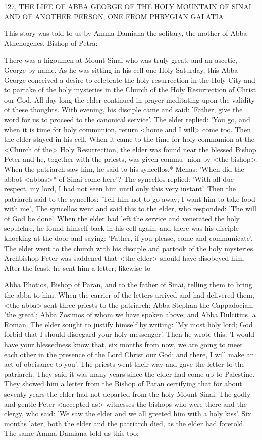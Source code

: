 127, THE LIFE OF ABBA GEORGE
OF THE HOLY MOUNTAIN
OF SINAI AND OF ANOTHER PERSON,
ONE FROM PHRYGIAN GALATIA

This story was told to us by Amma Damiana the solitary, the
mother of Abba Athenogenes, Bishop of Petra:

There was a higoumen at Mount Sinai who was truly great, and an
ascetic, George by name.
As he was sitting in his cell one Holy
Saturday, this Abba George conceived a desire to celebrate the holy
resurrection in the Holy City and to partake of the holy mysteries
in the Church of the Holy Resurrection of Christ our God.
All day
long the elder continued in prayer meditating upon the validity of
these thoughts.
With evening, his disciple came and said: 'Father,
give the word for us to proceed to the canonical service'.
The elder
replied: 'You go, and when it is time for holy communion, return
<home and I will> come too.
Then the elder stayed in his cell.
When it came to the time for holy communion at the <Church of
the> Holy Resurrection, the elder was found near the blessed
Bishop Peter and he, together with the priests, was given commu-
nion by <the bishop>.
When the patriarch saw him, he said to his
syncellos,* Menas: 'When did the abbot <abbas>* of Sinai come
here'? The syncellos replied: 'With all due respect, my lord, I had
not seen him until only this very instant'.
Then the patriarch said to
the syncellos: 'Tell him not to go away; I want him to take food
with me', The syncellos went and said this to the elder, who
responded: 'The will of God be done'.
When the elder had left the
service and venerated the holy sepulchre, he found himself back in
his cell again, and there was his disciple knocking at the door and
saying: 'Father, if you please, come and communicate'.
The elder
went to the church with his disciple and partook of the holy
mysteries.
Archbishop Peter was saddened that <the elder> should
have disobeyed him.
After the feast, he sent him a letter; likewise to

Abba Photios, Bishop of Paran, and to the father of Sinai, telling
them to bring the abba to him.
When the carrier of the letters
arrived and had delivered them, <the abba> sent three priests to the
patriarch: Abba Stephan the Cappadocian, 'the great'; Abba
Zosimos of whom we have spoken above; and Abba Dulcitius, a
Roman.
The elder sought to justify himself by writing: 'My most
holy lord; God forbid that I should disregard your holy messenger'.
Then he wrote this: 'I would have your blessedness know that, six
months from now, we are going to meet each other in the presence
of the Lord Christ our God; and there, I will make an act of
obeisance to you'.
The priests went their way and gave the letter to
the patriarch.
They said it was many years since the elder had come
up to Palestine.
They showed him a letter from the Bishop of Paran
certifying that for about seventy years the elder had not departed
from the holy Mount Sinai.
The godly and gentle Peter <accepted
as> witnesses the bishops who were there and the clergy, who said:
'We saw the elder and we all greeted him with a holy kiss'.
Six
months later, both the elder and the patriarch died, as the elder had
foretold.
The same Amma Damiana told us this too:

